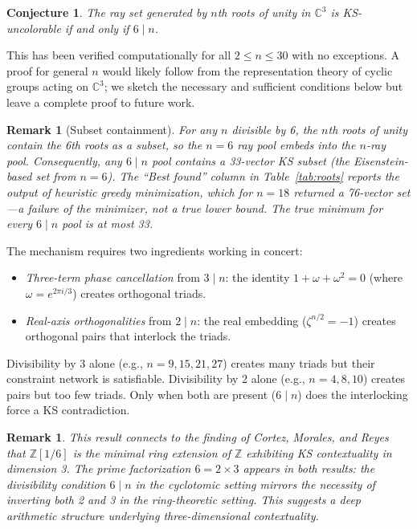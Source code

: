 \documentclass[12pt,a4paper]{article}
\newtheorem{conjecture}[theorem]{Conjecture}
\newtheorem{remark}[theorem]{Remark}
\newcommand{\C}{\mathbb{C}}
\newcommand{\Z}{\mathbb{Z}}
\begin{document}
\begin{conjecture}\label{conj:6n}
The ray set generated by $n$th roots of unity in $\C^3$ is KS-uncolorable if and only if $6 \mid n$.
\end{conjecture}

This has been verified computationally for all $2 \leq n \leq 30$ with no exceptions. A proof for general $n$ would likely follow from the representation theory of cyclic groups acting on $\C^3$; we sketch the necessary and sufficient conditions below but leave a complete proof to future work.

\begin{remark}[Subset containment]
For any $n$ divisible by 6, the $n$th roots of unity contain the 6th roots as a subset, so the $n=6$ ray pool embeds into the $n$-ray pool. Consequently, any $6\mid n$ pool contains a 33-vector KS subset (the Eisenstein-based set from $n=6$). The ``Best found'' column in Table~\ref{tab:roots} reports the output of heuristic greedy minimization, which for $n=18$ returned a 76-vector set---a failure of the minimizer, not a true lower bound. The true minimum for every $6\mid n$ pool is at most 33.
\end{remark}

The mechanism requires two ingredients working in concert:
\begin{itemize}
    \item \emph{Three-term phase cancellation} from $3 \mid n$: the identity $1 + \omega + \omega^2 = 0$ (where $\omega = e^{2\pi i/3}$) creates orthogonal triads.
    \item \emph{Real-axis orthogonalities} from $2 \mid n$: the real embedding ($\zeta^{n/2} = -1$) creates orthogonal pairs that interlock the triads.
\end{itemize}

Divisibility by 3 alone (e.g., $n = 9, 15, 21, 27$) creates many triads but their constraint network is satisfiable. Divisibility by 2 alone (e.g., $n = 4, 8, 10$) creates pairs but too few triads. Only when both are present ($6 \mid n$) does the interlocking force a KS contradiction.

\begin{remark}
This result connects to the finding of Cortez, Morales, and Reyes~\cite{CortezMoralesReyes2022} that $\Z[1/6]$ is the minimal ring extension of $\Z$ exhibiting KS contextuality in dimension 3. The prime factorization $6 = 2 \times 3$ appears in both results: the divisibility condition $6 \mid n$ in the cyclotomic setting mirrors the necessity of inverting both 2 and 3 in the ring-theoretic setting. This suggests a deep arithmetic structure underlying three-dimensional contextuality.
\end{remark}
\end{document}
